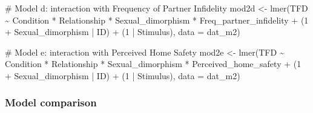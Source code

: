 \documentclass[
  bookmarksnumbered]{article}
\newenvironment{Shaded}{\begin{snugshade}}{\end{snugshade}}
\newcommand{\AttributeTok}[1]{\textcolor[rgb]{0.80,0.80,0.80}{#1}}
\newcommand{\CommentTok}[1]{\textcolor[rgb]{0.50,0.62,0.50}{#1}}
\newcommand{\DecValTok}[1]{\textcolor[rgb]{0.86,0.86,0.80}{#1}}
\newcommand{\FunctionTok}[1]{\textcolor[rgb]{0.94,0.94,0.56}{#1}}
\newcommand{\NormalTok}[1]{\textcolor[rgb]{0.80,0.80,0.80}{#1}}
\newcommand{\OtherTok}[1]{\textcolor[rgb]{0.94,0.94,0.56}{#1}}
\newcommand{\SpecialCharTok}[1]{\textcolor[rgb]{0.86,0.64,0.64}{#1}}
\newcommand{\StringTok}[1]{\textcolor[rgb]{0.80,0.58,0.58}{#1}}
\begin{document}
\begin{Shaded}
\begin{Highlighting}[]
\CommentTok{\# Model d: interaction with Frequency of Partner Infidelity}
\NormalTok{mod2d }\OtherTok{\textless{}{-}} \FunctionTok{lmer}\NormalTok{(TFD }\SpecialCharTok{\textasciitilde{}}
\NormalTok{                Condition }\SpecialCharTok{*}\NormalTok{ Relationship }\SpecialCharTok{*}\NormalTok{ Sexual\_dimorphism }\SpecialCharTok{*}\NormalTok{ Freq\_partner\_infidelity }\SpecialCharTok{+}
\NormalTok{                (}\DecValTok{1} \SpecialCharTok{+}\NormalTok{ Sexual\_dimorphism }\SpecialCharTok{|}\NormalTok{ ID) }\SpecialCharTok{+}\NormalTok{ (}\DecValTok{1} \SpecialCharTok{|}\NormalTok{ Stimulus), }
              \AttributeTok{data =}\NormalTok{ dat\_m2)}

\CommentTok{\# Model e: interaction with Perceived Home Safety}
\NormalTok{mod2e }\OtherTok{\textless{}{-}} \FunctionTok{lmer}\NormalTok{(TFD }\SpecialCharTok{\textasciitilde{}}
\NormalTok{                Condition }\SpecialCharTok{*}\NormalTok{ Relationship }\SpecialCharTok{*}\NormalTok{ Sexual\_dimorphism }\SpecialCharTok{*}\NormalTok{ Perceived\_home\_safety }\SpecialCharTok{+}
\NormalTok{                (}\DecValTok{1} \SpecialCharTok{+}\NormalTok{ Sexual\_dimorphism }\SpecialCharTok{|}\NormalTok{ ID) }\SpecialCharTok{+}\NormalTok{ (}\DecValTok{1} \SpecialCharTok{|}\NormalTok{ Stimulus), }
              \AttributeTok{data =}\NormalTok{ dat\_m2)}
\end{Highlighting}
\end{Shaded}

\subsubsection{Model comparison}\label{model-comparison-1}

\begin{Shaded}
\end{Shaded}
\end{document}
